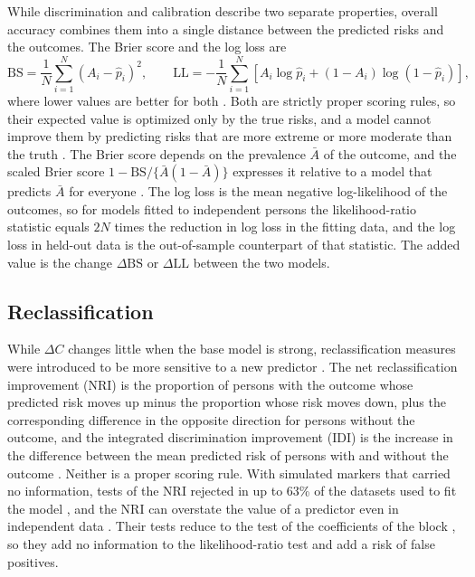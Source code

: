 While discrimination and calibration describe two separate properties, overall accuracy combines them into a single distance between the predicted risks and the outcomes.
The Brier score and the log loss are
\begin{equation}
  \mathrm{BS} = \frac{1}{N} \sum_{i=1}^{N} \left( A_i - \hat p_i \right)^2 ,
  \qquad
  \mathrm{LL} = -\frac{1}{N} \sum_{i=1}^{N} \left[ A_i \log \hat p_i + (1 - A_i) \log (1 - \hat p_i) \right],
  \label{eq:tech-brier}
\end{equation}
where lower values are better for both \cite{brier1950verification, steyerberg2010performance}.
Both are strictly proper scoring rules, so their expected value is optimized only by the true risks, and a model cannot improve them by predicting risks that are more extreme or more moderate than the truth \cite{steyerberg2010performance}.
The Brier score depends on the prevalence $\bar A$ of the outcome, and the scaled Brier score $1 - \mathrm{BS} / \{\bar A (1 - \bar A)\}$ expresses it relative to a model that predicts $\bar A$ for everyone \cite{steyerberg2010performance}.
The log loss is the mean negative log-likelihood of the outcomes, so for models fitted to independent persons the likelihood-ratio statistic equals $2N$ times the reduction in log loss in the fitting data, and the log loss in held-out data is the out-of-sample counterpart of that statistic.
The added value is the change $\Delta\mathrm{BS}$ or $\Delta\mathrm{LL}$ between the two models.

\subsection{Reclassification}
\label{sec:tech-reclassification}

While $\Delta C$ changes little when the base model is strong, reclassification measures were introduced to be more sensitive to a new predictor \cite{pencina2008nri}.
The net reclassification improvement (NRI) is the proportion of persons with the outcome whose predicted risk moves up minus the proportion whose risk moves down, plus the corresponding difference in the opposite direction for persons without the outcome, and the integrated discrimination improvement (IDI) is the increase in the difference between the mean predicted risk of persons with and without the outcome \cite{pencina2008nri}.
Neither is a proper scoring rule.
With simulated markers that carried no information, tests of the NRI rejected in up to 63\% of the datasets used to fit the model \cite{pepe2014nripvalues}, and the NRI can overstate the value of a predictor even in independent data \cite{kerr2014nri}.
Their tests reduce to the test of the coefficients of the block \cite{pepe2013testing}, so they add no information to the likelihood-ratio test and add a risk of false positives.

